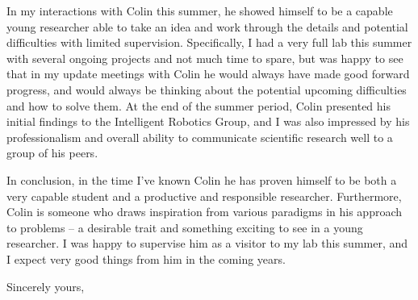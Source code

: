 \documentclass[12pt]{letter} %
\begin{document}
\begin{letter}{}
In my interactions with Colin this summer, he showed himself to be a capable young 
researcher able to take an idea and work through the details and potential difficulties 
with limited supervision. Specifically, I had a very full lab this summer with 
several ongoing projects and not much time to spare, but was happy to see that in 
my update meetings with Colin he would always have made good forward progress, and 
would always be thinking about the potential upcoming difficulties and how to 
solve them. At the end of the summer period, Colin presented his initial findings
to the Intelligent Robotics Group, and I was also impressed by his professionalism 
and overall ability to communicate scientific research well to a group of his peers.

In conclusion, in the time I've known Colin he has proven himself to be both a very capable
student and a productive and responsible researcher. Furthermore, Colin is someone who draws 
inspiration from various paradigms in his approach to problems -- a desirable trait and
something exciting to see in a young researcher. I was happy to supervise him 
as a visitor to my lab this summer, and I expect very good things from him in the coming years. 

\closing{Sincerely yours,
\\
}

\end{letter}
\end{document}
